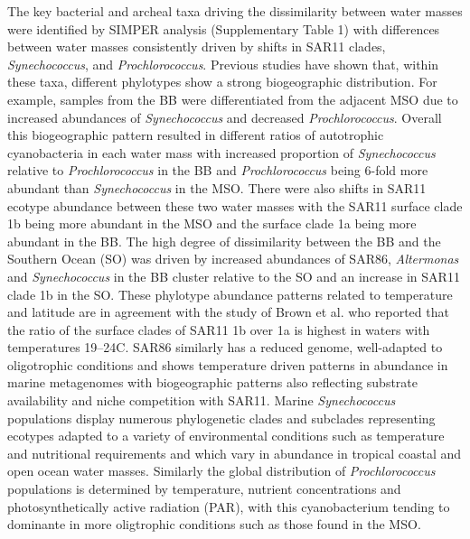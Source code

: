 The key bacterial and archeal taxa driving the dissimilarity between water masses were identified by SIMPER analysis (Supplementary Table 1) with differences between water masses consistently driven by shifts in SAR11 clades, {\em Synechococcus}, and {\em Prochlorococcus}. Previous studies have shown that, within these taxa, different phylotypes show a strong biogeographic distribution. \cite{brown_trait_2014} For example, samples from the BB were differentiated from the adjacent MSO due to increased abundances of {\em Synechococcus} and decreased {\em Prochlorococcus}. Overall this biogeographic pattern resulted in different ratios of autotrophic cyanobacteria in each water mass with increased proportion of {\em Synechococcus} relative to {\em Prochlorococcus} in the BB and {\em Prochlorococcus} being 6-fold more abundant than {\em Synechococcus} in the MSO. There were also shifts in SAR11 ecotype abundance between these two water masses with the SAR11 surface clade 1b being more abundant in the MSO and the surface clade 1a being more abundant in the BB. The high degree of dissimilarity between the BB and the Southern Ocean (SO) was driven by increased abundances of SAR86, {\em Altermonas} and {\em Synechococcus} in the BB cluster relative to the SO and an increase in SAR11 clade 1b in the SO. These phylotype abundance patterns related to temperature and latitude are in agreement with the study of Brown et al. \cite{brown_global_2012} who reported that the ratio of the surface clades of SAR11 1b over 1a is highest in waters with temperatures 19–24\degree C. \cite{brown_global_2012} SAR86 similarly has a reduced genome, well-adapted to oligotrophic conditions and shows temperature driven patterns in abundance in marine metagenomes \cite{dupont_genomic_2012} with biogeographic patterns also reflecting substrate availability and niche competition with SAR11. \cite{dupont_genomic_2012} Marine {\em Synechococcus} populations display numerous phylogenetic clades and subclades \cite{mazard_multi-locus_2012} representing ecotypes adapted to a variety of environmental conditions such as temperature and nutritional requirements and which vary in abundance in tropical coastal and open ocean water masses. \cite{brown_trait_2014} Similarly the global distribution of {\em Prochlorococcus} populations is determined by temperature, nutrient concentrations and photosynthetically active radiation (PAR), with this cyanobacterium tending to dominante in more oligtrophic conditions \cite{brown_trait_2014} such as those found in the MSO.